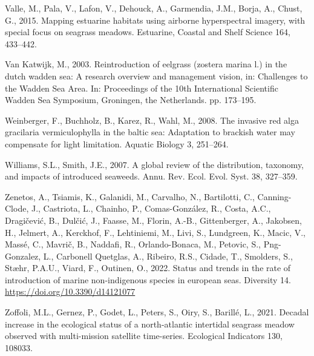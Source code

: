 \documentclass[
  letterpaper,
  DIV=11,
  numbers=noendperiod]{scrartcl}
\newlength{\cslhangindent}
\newenvironment{CSLReferences}[2] %
 {\begin{list}{}{%
  \setlength{\itemindent}{0pt}
  \setlength{\leftmargin}{0pt}
  \setlength{\parsep}{0pt}
  \ifodd #1
   \setlength{\leftmargin}{\cslhangindent}
   \setlength{\itemindent}{-1\cslhangindent}
  \fi
  \setlength{\itemsep}{#2\baselineskip}}}
 {\end{list}}
\begin{document}
\begin{CSLReferences}{1}{0}
Valle, M., Pala, V., Lafon, V., Dehouck, A., Garmendia, J.M., Borja, A.,
Chust, G., 2015. Mapping estuarine habitats using airborne hyperspectral
imagery, with special focus on seagrass meadows. Estuarine, Coastal and
Shelf Science 164, 433--442.

Van Katwijk, M., 2003. Reintroduction of eelgrass (zostera marina l.) in
the dutch wadden sea: A research overview and management vision, in:
Challenges to the Wadden Sea Area. In: Proceedings of the 10th
International Scientific Wadden Sea Symposium, Groningen, the
Netherlands. pp. 173--195.

Weinberger, F., Buchholz, B., Karez, R., Wahl, M., 2008. The invasive
red alga gracilaria vermiculophylla in the baltic sea: Adaptation to
brackish water may compensate for light limitation. Aquatic Biology 3,
251--264.

Williams, S.L., Smith, J.E., 2007. A global review of the distribution,
taxonomy, and impacts of introduced seaweeds. Annu. Rev. Ecol. Evol.
Syst. 38, 327--359.

Zenetos, A., Tsiamis, K., Galanidi, M., Carvalho, N., Bartilotti, C.,
Canning-Clode, J., Castriota, L., Chainho, P., Comas-González, R.,
Costa, A.C., Dragičević, B., Dulčić, J., Faasse, M., Florin, A.-B.,
Gittenberger, A., Jakobsen, H., Jelmert, A., Kerckhof, F., Lehtiniemi,
M., Livi, S., Lundgreen, K., Macic, V., Massé, C., Mavrič, B., Naddafi,
R., Orlando-Bonaca, M., Petovic, S., Png-Gonzalez, L., Carbonell
Quetglas, A., Ribeiro, R.S., Cidade, T., Smolders, S., Stæhr, P.A.U.,
Viard, F., Outinen, O., 2022. Status and trends in the rate of
introduction of marine non-indigenous species in european seas.
Diversity 14. \url{https://doi.org/10.3390/d14121077}

Zoffoli, M.L., Gernez, P., Godet, L., Peters, S., Oiry, S., Barillé, L.,
2021. Decadal increase in the ecological status of a north-atlantic
intertidal seagrass meadow observed with multi-mission satellite
time-series. Ecological Indicators 130, 108033.

\end{CSLReferences}
\end{document}
